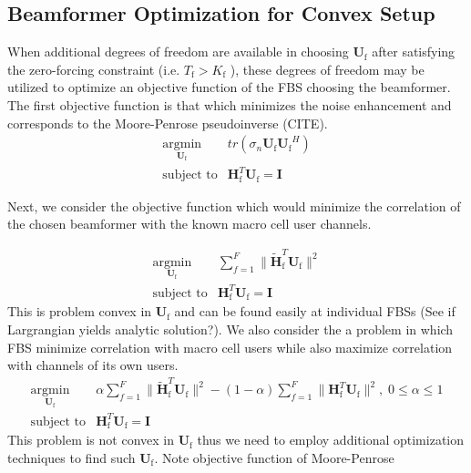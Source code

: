 \documentclass[12pt,a4paper]{report}
\begin{document}
\subsection{Beamformer Optimization for Convex Setup}
When additional degrees of freedom are available in choosing $\mathbf{U}_{\mathrm{f}}$ after satisfying the zero-forcing constraint (i.e. $T_{\text{f}}> K_{\text{f}}$ ), these degrees of freedom may be utilized to optimize an objective function of the FBS choosing the beamformer. 
The first objective function is that which minimizes the noise enhancement and corresponds to the Moore-Penrose pseudoinverse (CITE). 
    \begin{equation}
    \begin{array}{ll}
    \underset{\mathbf{U}_{\mathrm{f}} }{\text{argmin}}   & tr(\sigma_n\mathbf{U_{\mathrm{f}}}  \mathbf{U_{\mathrm{f}}}^H)
    \\
    \mbox{subject to} & \mathbf{H}_{\mathrm{f}}^T  \mathbf{U_{\mathrm{f}}} = \mathbf{I}
    \end{array}
    \label{e-opt-prob}
    \end{equation}

Next, we consider the objective function which would minimize the correlation of the chosen beamformer with the known macro cell user channels.

    \begin{equation}
    \begin{array}{ll}
    \underset{\mathbf{U}_{\mathrm{f}} }{\text{argmin}}   & \sum^F_{f=1} \|\mathbf{\tilde{H}}_{\mathrm{f}}^T  \mathbf{U_{\mathrm{f}}}\|^2
    \\
    \mbox{subject to} & \mathbf{H}_{\mathrm{f}}^T  \mathbf{U_{\mathrm{f}}} = \mathbf{I}
    \end{array}
    \label{e-opt-prob}
    \end{equation}
This is problem convex in $\mathbf{U}_{\mathrm{f}}$ and can be found easily at individual FBSs (See if Largrangian yields analytic solution?).
We also consider the a problem in which FBS minimize correlation with macro cell users while also maximize correlation with channels of its own users. 
    \begin{equation}
    \begin{array}{ll}
    \underset{\mathbf{U}_{\mathrm{f}} }{\text{argmin}}   & \alpha\sum^F_{f=1} \|\mathbf{\tilde{H}}_{\mathrm{f}}^T  \mathbf{U_{\mathrm{f}}}\|^2
    -
    (1-\alpha)\sum^F_{f=1} \|\mathbf{H}_{\mathrm{f}}^T  \mathbf{U_{\mathrm{f}}}\|^2, \; 0\leq \alpha \leq 1
    \\
    \mbox{subject to} & \mathbf{H}_{\mathrm{f}}^T  \mathbf{U_{\mathrm{f}}} = \mathbf{I}
    \end{array}
    \label{e-opt-prob}
    \end{equation}
    This problem is not convex in $\mathbf{U}_{\mathrm{f}}$ thus we need to employ additional optimization techniques to find such $\mathbf{U}_{\mathrm{f}}$.
Note objective function of Moore-Penrose
\end{document}
